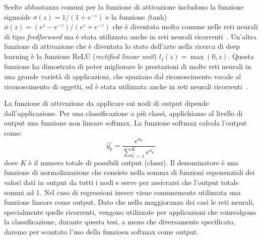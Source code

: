 Scelte abbastanza comuni per la funzione di attivazione includono la funzione sigmoide $\sigma(z) = 1/(1+e^{-z})$ e la funzione \emph(tanh) $\phi(z)=(e^z-e^{-z})/(e^z+e^{-z})$ che \`e diventata molto comune nelle reti neurali di tipo \emph{feedforward} ma \`e stata utilizzata anche in reti neurali ricorrenti~\cite{Sutskever:2011}.
Un'altra funzione di attivazione che \`e diventata lo stato dell'arte nella ricerca di deep learning \`e la funzione ReLU (\emph{rectified linear unit}) $l_j(z)=\operatorname{max}(0, z)$.
Questa funzione ha dimostrato di poter migliorare le prestazioni di molte reti neurali in una grande variet\`a di applicazioni, che spaziano dal riconoscimento vocale al riconoscimento di oggetti, ed \`e stata utilizzata anche in reti neurali ricorrenti~\cite{Bengio:2013}.

La funzione di attivazione da applicare sui nodi di output dipende dall'applicazione.
Per una classificazione a pi\`u classi, applichiamo al livello di output una funzione non lineare softmax.
La funzione softmax calcola l'output come:
\begin{equation}
  \hat{y_k} = \frac{e^{a_k}}{\sum_{k^{'}=1}^{K} e^{a_{k^{'}}}}
\end{equation}
dove $K$ \`e il numero totale di possibili output (classi). Il denominatore \`e una funzione di normalizzazione che consiste nella somma di funzioni esponenziali dei valori dati in output da tutti i nodi e serve per assicrarsi che l'output totale sommi ad 1.
Nel caso di regressioni invece viene comunemente utilizzata una funzione lineare come output.
Dato che nella maggioranza dei casi le reti neurali, specialmente quelle ricorrenti, vengono utilizzate per applicazioni che coinvolgono la classificazione, durante questa tesi, a meno che diversamente specificato, daremo per scontato l'uso della funzioen softmax come output.

